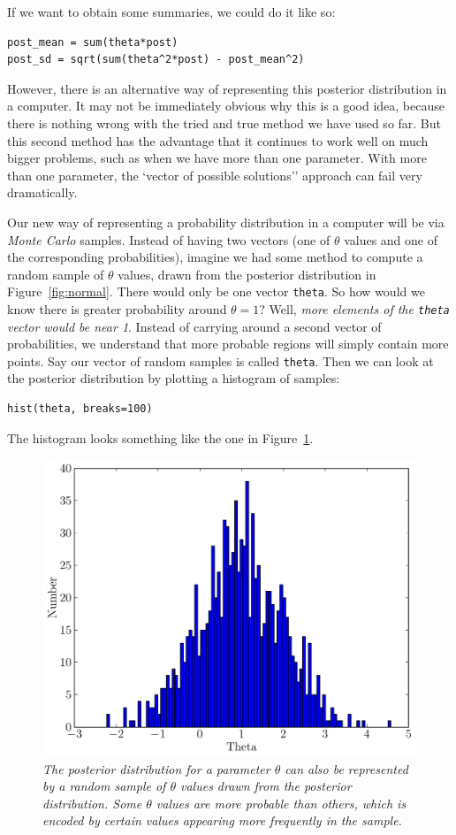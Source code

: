 If we want to obtain some summaries, we could do it like so:
\begin{verbatim}
post_mean = sum(theta*post)
post_sd = sqrt(sum(theta^2*post) - post_mean^2)
\end{verbatim}

However,
there is an alternative way of representing this posterior distribution in a
computer. It may not be immediately obvious why this is a good idea,
because there is nothing wrong with the tried and true method we have used
so far. But this second method has the advantage that it continues to
work well on much bigger problems, such as when we have more than one parameter.
With more than one parameter, the `vector of possible solutions'' approach
can fail very dramatically.

Our new way of representing a probability distribution in a computer will be
via {\it Monte Carlo} samples.
Instead of having two vectors (one of $\theta$ values and one of the
corresponding probabilities),
imagine we had some method to compute a random sample of $\theta$ values, drawn
from the posterior distribution in Figure~\ref{fig:normal}.
There would only be one vector {\tt theta}. So how would we
know there is greater probability around $\theta=1$? Well, {\it more elements
of the {\tt theta} vector would be near 1}.
Instead of carrying around a second vector of
probabilities, we understand that more probable regions will simply contain
more points. Say our vector of random
samples is called {\tt theta}. Then we can look at the posterior distribution
by plotting a histogram of samples:
\begin{verbatim}
hist(theta, breaks=100)
\end{verbatim}
The histogram looks something like the one in Figure~\ref{fig:normal2}.
\begin{figure}[ht!]
\begin{center}
\includegraphics[scale=0.5]{Figures/normal2.pdf}
\caption{\it The posterior distribution for a parameter $\theta$ can also be
represented by a random sample of $\theta$ values drawn from the posterior
distribution. Some $\theta$ values are more probable than others, which is
encoded by certain values appearing more frequently in the sample.
\label{fig:normal2}}
\end{center}
\end{figure}
